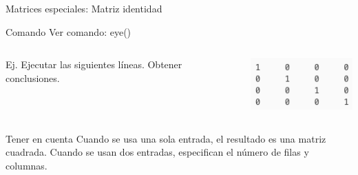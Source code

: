 \begin{frame}{Matrices especiales: Matriz identidad}
\begin{exampleblock}{Comando}
Ver comando: eye()
\end{exampleblock}
\begin{columns}
\begin{column}{0.5\textwidth}
Ej. Ejecutar las siguientes líneas. Obtener conclusiones.
\end{column}
\begin{column}{0.5\textwidth}
\begin{center}
\includegraphics[scale=0.5]{images/pantalla3.png}
\end{center}
\end{column}
\end{columns}
\begin{block}{Tener en cuenta}
Cuando se usa una sola entrada, el resultado es una matriz cuadrada. Cuando se usan dos entradas, especifican el número de filas y columnas.
\end{block}
\end{frame}